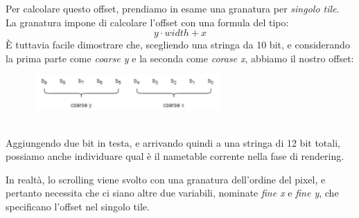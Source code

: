 \documentclass[11pt]{article}
\begin{document}
Per calcolare questo offset, prendiamo in esame una granatura per \emph{singolo tile}.\\
La granatura impone di calcolare l'offset con una formula del tipo:
\[
	y\cdot width+ x
\]
È tuttavia facile dimostrare che, scegliendo una stringa da 10 bit, e considerando la prima parte come \emph{coarse y} e la seconda come \emph{corase x}, abbiamo il nostro offset:
\begin{figure}[h]
\centering
\includegraphics[width=275px, height=50px]{OFFSET_CALC.png}
\end{figure}\\
Aggiungendo due bit in testa, e arrivando quindi a una stringa di 12 bit totali, possiamo anche individuare qual è il nametable corrente nella fase di rendering.

In realtà, lo scrolling viene svolto con una granatura dell'ordine del pixel, e pertanto necessita che ci siano altre due variabili, nominate \emph{fine x} e \emph{fine y}, che specificano l'offset nel singolo tile.
\end{document}

